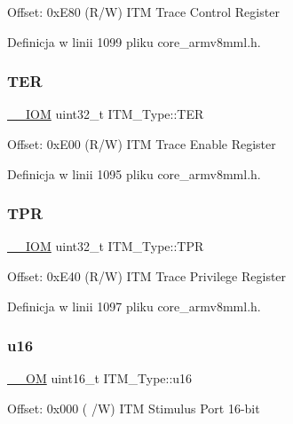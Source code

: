 Offset\+: 0x\+E80 (R/W) I\+TM Trace Control Register 

Definicja w linii 1099 pliku core\+\_\+armv8mml.\+h.

\mbox{\label{struct_i_t_m___type_acd03c6858f7b678dab6a6121462e7807}} 
\subsubsection{\texorpdfstring{T\+ER}{TER}}
{\footnotesize\ttfamily \hyperlink{core__sc300_8h_ab6caba5853a60a17e8e04499b52bf691}{\+\_\+\+\_\+\+I\+OM} uint32\+\_\+t I\+T\+M\+\_\+\+Type\+::\+T\+ER}

Offset\+: 0x\+E00 (R/W) I\+TM Trace Enable Register 

Definicja w linii 1095 pliku core\+\_\+armv8mml.\+h.

\mbox{\label{struct_i_t_m___type_ae907229ba50538bf370fbdfd54c099a2}} 
\subsubsection{\texorpdfstring{T\+PR}{TPR}}
{\footnotesize\ttfamily \hyperlink{core__sc300_8h_ab6caba5853a60a17e8e04499b52bf691}{\+\_\+\+\_\+\+I\+OM} uint32\+\_\+t I\+T\+M\+\_\+\+Type\+::\+T\+PR}

Offset\+: 0x\+E40 (R/W) I\+TM Trace Privilege Register 

Definicja w linii 1097 pliku core\+\_\+armv8mml.\+h.

\mbox{\label{struct_i_t_m___type_a962a970dfd286cad7f8a8577e87d4ad3}} 
\subsubsection{\texorpdfstring{u16}{u16}}
{\footnotesize\ttfamily \hyperlink{core__sc300_8h_a0ea2009ed8fd9ef35b48708280fdb758}{\+\_\+\+\_\+\+OM} uint16\+\_\+t I\+T\+M\+\_\+\+Type\+::u16}

Offset\+: 0x000 ( /W) I\+TM Stimulus Port 16-\/bit 

